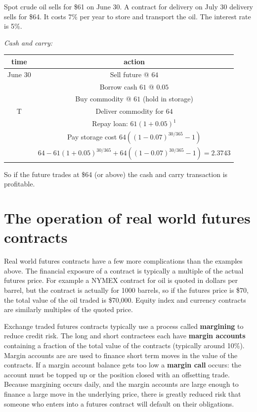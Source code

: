 Spot crude oil sells for \$61 on June 30. A contract for delivery on July 30 delivery sells for \$64. It costs 7\% per year to store and transport the oil. The interest rate is 5\%.

\textit{Cash and carry:}

\begin{center} \begin{tabular}{|c|c|}
  \hline
  time & action \\
  \hline
  June 30 & Sell future @ $64$  \\
    & Borrow cash $61$ @ $0.05$ \\
    & Buy commodity @ $61$ (hold in storage) \\
  \hline
 T & Deliver commodity for $64$ \\
   & Repay loan: $61(1+0.05)^1$ \\
   & Pay storage cost $64((1-0.07)^{30/365}-1)$\\
  \hline
   & $64 - 61(1+0.05)^{30/365} + 64((1-0.07)^{30/365}-1) = 2.3743$\\
  \hline
\end{tabular}\end{center}

So if the future trades at \$64 (or above) the cash and carry transaction is profitable.

\section{The operation of real world futures contracts}

Real world futures contracts have a few more complications than the examples above. The financial exposure of a contract is typically a multiple of the actual futures price. For example a NYMEX contract for oil is quoted in dollars per barrel, but the contract is actually for 1000 barrels, so if the futures price is \$70, the total value of the oil traded is \$70,000. Equity index and currency contracts are similarly multiples of the quoted price.

Exchange traded futures contracts typically use a process called \textbf{margining} to reduce credit risk. The long and short contractees each have \textbf{margin accounts} containing a fraction of the total value of the contracts (typically around 10\%). Margin accounts are are used to finance short term moves in the value of the contracts. If a margin account balance gets too low a \textbf{margin call} occurs: the account must be topped up or the position closed with an offsetting trade. Because margining occurs daily, and the margin accounts are large enough to finance a large move in the underlying price, there is greatly reduced risk that someone who enters into a futures contract will default on their obligations. 

